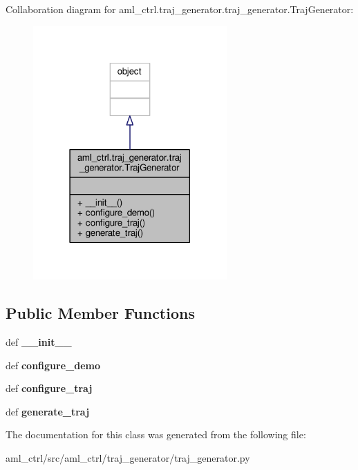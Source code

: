 Collaboration diagram for aml\-\_\-ctrl.\-traj\-\_\-generator.\-traj\-\_\-generator.\-Traj\-Generator\-:\nopagebreak
\begin{figure}[H]
\begin{center}
\leavevmode
\includegraphics[width=210pt]{classaml__ctrl_1_1traj__generator_1_1traj__generator_1_1_traj_generator__coll__graph}
\end{center}
\end{figure}
\subsection*{Public Member Functions}
\begin{DoxyCompactItemize}
\item 
\hypertarget{classaml__ctrl_1_1traj__generator_1_1traj__generator_1_1_traj_generator_a31360c34bfed75e4a54fab91c93d49c2}{def {\bfseries \-\_\-\-\_\-init\-\_\-\-\_\-}}\label{classaml__ctrl_1_1traj__generator_1_1traj__generator_1_1_traj_generator_a31360c34bfed75e4a54fab91c93d49c2}

\item 
\hypertarget{classaml__ctrl_1_1traj__generator_1_1traj__generator_1_1_traj_generator_a16f4cfdbab3c1db8eaaaa4f097fe324f}{def {\bfseries configure\-\_\-demo}}\label{classaml__ctrl_1_1traj__generator_1_1traj__generator_1_1_traj_generator_a16f4cfdbab3c1db8eaaaa4f097fe324f}

\item 
\hypertarget{classaml__ctrl_1_1traj__generator_1_1traj__generator_1_1_traj_generator_aa826e4e07593593b5501ae443ca1f244}{def {\bfseries configure\-\_\-traj}}\label{classaml__ctrl_1_1traj__generator_1_1traj__generator_1_1_traj_generator_aa826e4e07593593b5501ae443ca1f244}

\item 
\hypertarget{classaml__ctrl_1_1traj__generator_1_1traj__generator_1_1_traj_generator_ab1d608cf96839a45eea2234d99d22934}{def {\bfseries generate\-\_\-traj}}\label{classaml__ctrl_1_1traj__generator_1_1traj__generator_1_1_traj_generator_ab1d608cf96839a45eea2234d99d22934}

\end{DoxyCompactItemize}


The documentation for this class was generated from the following file\-:\begin{DoxyCompactItemize}
\item 
aml\-\_\-ctrl/src/aml\-\_\-ctrl/traj\-\_\-generator/traj\-\_\-generator.\-py\end{DoxyCompactItemize}
